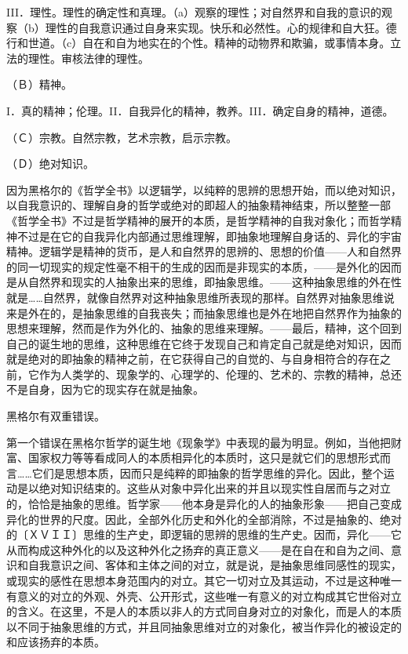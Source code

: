 \documentclass[a4paper,twoside,12pt,AutoFakeBold]{ctexart}
\begin{document}
III．理性。理性的确定性和真理。（a）观察的理性；对自然界和自我的意识的观察（b）理性的自我意识通过自身来实现。快乐和必然性。心的规律和自大狂。德行和世道。（c）自在和自为地实在的个性。精神的动物界和欺骗，或事情本身。立法的理性。审核法律的理性。

（Ｂ）精神。

I．真的精神；伦理。II．自我异化的精神，教养。III．确定自身的精神，道德。

（Ｃ）宗教。自然宗教，艺术宗教，启示宗教。

（Ｄ）绝对知识。

因为黑格尔的《哲学全书》以逻辑学，以纯粹的思辨的思想开始，而以绝对知识，以自我意识的、理解自身的哲学或绝对的即超人的抽象精神结束，所以整整一部《哲学全书》不过是哲学精神的展开的本质，是哲学精神的自我对象化；而哲学精神不过是在它的自我异化内部通过思维理解，即抽象地理解自身话的、异化的宇宙精神。逻辑学是精神的货币，是人和自然界的思辨的、思想的价值——人和自然界的同一切现实的规定性毫不相干的生成的因而是非现实的本质，——是外化的因而是从自然界和现实的人抽象出来的思维，即抽象思维。——这种抽象思维的外在性就是……自然界，就像自然界对这种抽象思维所表现的那样。自然界对抽象思维说来是外在的，是抽象思维的自我丧失；而抽象思维也是外在地把自然界作为抽象的思想来理解，然而是作为外化的、抽象的思维来理解。——最后，精神，这个回到自己的诞生地的思维，这种思维在它终于发现自己和肯定自己就是绝对知识，因而就是绝对的即抽象的精神之前，在它获得自己的自觉的、与自身相符合的存在之前，它作为人类学的、现象学的、心理学的、伦理的、艺术的、宗教的精神，总还不是自身，因为它的现实存在就是抽象。

黑格尔有双重错误。

第一个错误在黑格尔哲学的诞生地《现象学》中表现的最为明显。例如，当他把财富、国家权力等等看成同人的本质相异化的本质时，这只是就它们的思想形式而言……它们是思想本质，因而只是纯粹的即抽象的哲学思维的异化。因此，整个运动是以绝对知识结束的。这些从对象中异化出来的并且以现实性自居而与之对立的，恰恰是抽象的思维。哲学家——他本身是异化的人的抽象形象——把自己变成异化的世界的尺度。因此，全部外化历史和外化的全部消除，不过是抽象的、绝对的〔ＸＶＩＩ〕思维的生产史，即逻辑的思辨的思维的生产史。因而，异化——它从而构成这种外化的以及这种外化之扬弃的真正意义——是在自在和自为之间、意识和自我意识之间、客体和主体之间的对立，就是说，是抽象思维同感性的现实，或现实的感性在思想本身范围内的对立。其它一切对立及其运动，不过是这种唯一有意义的对立的外观、外壳、公开形式，这些唯一有意义的对立构成其它世俗对立的含义。在这里，不是人的本质以非人的方式同自身对立的对象化，而是人的本质以不同于抽象思维的方式，并且同抽象思维对立的对象化，被当作异化的被设定的和应该扬弃的本质。
\end{document}

